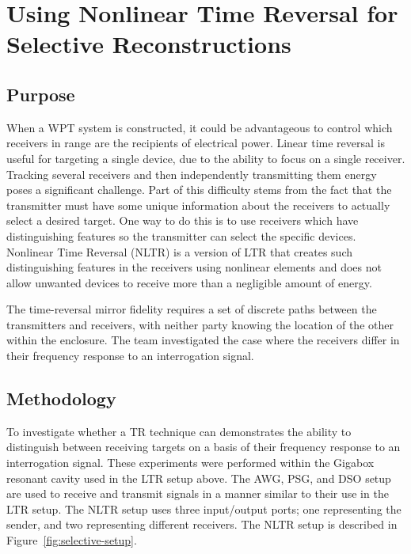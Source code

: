 \chapter{Using Nonlinear Time Reversal for Selective Reconstructions}
\label{ch:selective}

\section{Purpose}
\label{sec:selective-purpose}

When a WPT system is constructed, it could be advantageous to control which receivers in range are the recipients of electrical power. Linear time reversal is useful for targeting a single device, due to the ability to focus on a single receiver. Tracking several receivers and then independently transmitting them energy poses a significant challenge. Part of this difficulty stems from the fact that the transmitter must have some unique information about the receivers to actually select a desired target. One way to do this is to use receivers which have distinguishing features so the transmitter can select the specific devices. Nonlinear Time Reversal (NLTR) is a version of LTR that creates such distinguishing features in the receivers using nonlinear elements and does not allow unwanted devices to receive more than a negligible amount of energy.

The time-reversal mirror fidelity requires a set of discrete paths between the transmitters and receivers, with neither party knowing the location of the other within the enclosure. The team investigated the case where the receivers differ in their frequency response to an interrogation signal.

\section{Methodology}
\label{sec:selective-meth}

To investigate whether a TR technique can demonstrates the ability to distinguish between receiving targets on a basis of their frequency response to an interrogation signal. These experiments were performed within the Gigabox resonant cavity used in the LTR setup above. The AWG, PSG, and DSO setup are used to receive and transmit signals in a manner similar to their use in the LTR setup. The NLTR setup uses three input/output ports; one representing the sender, and two representing different receivers. The NLTR setup is described in Figure~\ref{fig:selective-setup}.

